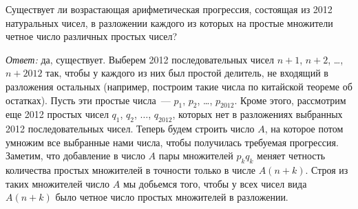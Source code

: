 \problem{}
Существует ли возрастающая арифметическая прогрессия, состоящая из 2012
натуральных чисел, в разложении каждого из которых на простые множители четное
число различных простых чисел?

\solution
\emph{Ответ:} да, существует.
Выберем 2012 последовательных чисел $n + 1$, $n + 2$, \ldots, $n + 2012$ так,
чтобы у каждого из них был простой делитель, не входящий в разложения остальных
(например, построим такие числа по китайской теореме об остатках).
Пусть эти простые числа~--- $p_1$, $p_2$, \ldots, $p_{2012}$.
Кроме этого, рассмотрим еще 2012 простых чисел
$q_1$, $q_2$, $\ldots$, $q_{2012}$,
которых нет в разложениях выбранных 2012 последовательных чисел.
Теперь будем строить число $A$, на которое потом умножим все выбранные нами
числа, чтобы получилась требуемая прогрессия.
Заметим, что добавление в число $A$ пары множителей $p_k q_k$ меняет четность
количества простых множителей в точности только в числе $A (n + k)$.
Строя из таких множителей число $A$ мы добьемся того, чтобы у всех чисел вида
$A (n + k)$ было четное число простых множителей в разложении.

\endproblem
